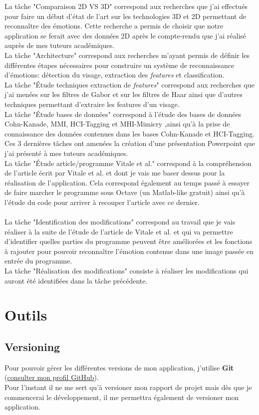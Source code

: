 \documentclass[poster]{polytech/polytech}
\begin{document}
La tâche "Comparaison 2D VS 3D" correspond aux recherches que j'ai effectués pour faire un début d'état de l'art sur les technologies 3D et 2D permettant de reconnaître des émotions. Cette recherche a permis de choisir que notre application se ferait avec des données 2D après le compte-rendu que j'ai réalisé auprès de mes tuteurs académiques.\\
La tâche "Architecture" correspond aux recherches m'ayant permis de définir les différentes étapes nécessaires pour construire un système de reconnaissance d'émotions: détection du visage, extraction des \textit{features} et classification.\\
La tâche "Étude techniques extraction de \textit{features}" correspond aux recherches que j'ai menées sur les filtres de Gabor et sur les filtres de Haar ainsi que d'autres techniques permettant d'extraire les features d'un visage.\\
La tâche "Étude bases de données" correspond à l'étude des bases de données Cohn-Kanade, MMI, HCI-Tagging et MHI-Mimicry ,ainsi qu'à la prise de connaissance des données contenues dans les bases Cohn-Kanade et HCI-Tagging.\\
Ces 3 dernières tâches ont amenées la création d'une présentation Powerpoint que j'ai présenté à mes tuteurs académiques.\\
La tâche "Étude article/programme Vitale et al." correspond à la compréhension de l'article écrit par Vitale et al. et dont je vais me baser dessus pour la réalisation de l'application. Cela correspond également au temps passé à essayer de faire marcher le programme sous Octave (un Matlab-like gratuit) ainsi qu'à l'étude du code pour arriver à recouper l'article avec ce dernier.\\
\\
La tâche "Identification des modifications" correspond au travail que je vais réaliser à la suite de l'étude de l'article de Vitale et al. et qui va permettre d'identifier quelles parties du programme peuvent être améliorées et les fonctions à rajouter pour pouvoir reconnaître l'émotion contenue dans une image passée en entrée du programme.\\
La tâche "Réalisation des modifications" consiste à réaliser les modifications qui auront été identifiées dans la tâche précédente.

\section{Outils}
\subsection{Versioning}
Pour pouvoir gérer les différentes versions de mon application, j'utilise \textbf{Git} (\href{https://github.com/flo3693}{consulter mon profil GitHub}).\\
Pour l'instant il ne me sert qu'à versioner mon rapport de projet mais dès que je commencerai le développement, il me permettra également de versioner mon application.
\end{document}
